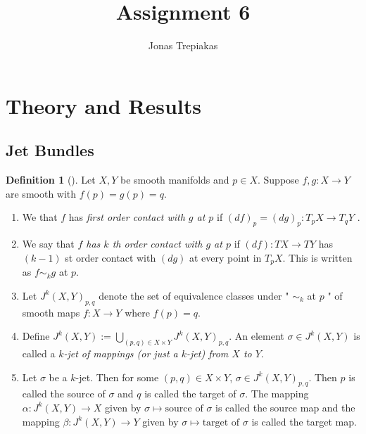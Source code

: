 \documentclass[reqno]{amsart}
\title{Assignment 6}
\author{Jonas Trepiakas}
\date{}
\theoremstyle{definition}
\newtheorem{definition}[theorem]{Definition}
\theoremstyle{remark}
\begin{document}
\maketitle
\tableofcontents

\section{Theory and Results}

    \subsection{Jet Bundles}

\begin{definition}[]
   Let $X,Y$ be smooth manifolds and $p \in X$.
   Suppose $f,g \colon X \to Y$ are smooth
   with $f(p) = g(p) = q$.
   \begin{enumerate}
       \item We that $f$ has \textit{first order contact
           with $g$ at $p$ } if $\left( df \right)_p
           = \left( dg \right)_p \colon
           T_p X \to T_q Y$ .
       \item We say that \textit{$f$ has $k$ th order
           contact with $g$ at $p$} if
           $\left( df \right) \colon
           TX \to TY$ has $\left( k-1 \right) $ st
           order contact with $\left( dg \right) $ at
           every point in $T_p X$. This is written
           as $f \sim_k g$ at $p$.
       \item Let $J^{k}(X,Y)_{p,q}$ denote the
           set of equivalence classes under
           " $\sim_k$ at $p$ " of smooth maps
           $f \colon X \to Y$ where
           $f(p) = q$.
       \item Define $J^{k}(X,Y) :=
           \bigcup_{\left( p,q \right) \in X \times Y}
           J^{k}(X,Y)_{p,q}$. An element
           $\sigma \in J^{k}(X,Y)$ is called a
           \textit{$k$-jet of mappings (or just a $k$-jet)
           from $X$ to $Y$}.
       \item Let $\sigma$ be a $k$-jet. Then
           for some $\left( p,q \right) \in X \times Y$,
           $\sigma \in J^{k}(X,Y)_{p,q}$. Then
           $p$ is called the source of $\sigma$ and
           $q$ is called the target of $\sigma$. The
           mapping $\alpha \colon J^{k}(X,Y) \to X$
           given by $\sigma \mapsto \text{source of } \sigma$
           is called the source map and the mapping
           $\beta \colon J^{k}(X,Y) \to Y$ given by
           $\sigma \mapsto \text{target of }\sigma$ is called
           the target map.
   \end{enumerate}
\end{definition}
\end{document}
